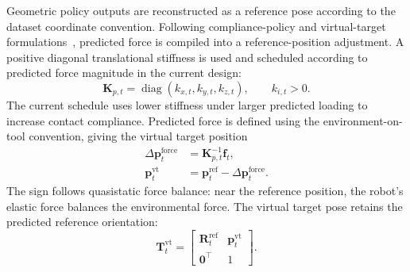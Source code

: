 Geometric policy outputs are reconstructed as a reference pose according to the dataset coordinate convention.
Following compliance-policy and virtual-target formulations~\cite{acp,umift}, predicted force is compiled into a reference-position adjustment.
A positive diagonal translational stiffness is used and scheduled according to predicted force magnitude in the current design:
\begin{equation}
    \mathbf{K}_{p,t}
    =\operatorname{diag}(k_{x,t},k_{y,t},k_{z,t}),
    \qquad k_{i,t}>0.
    \label{eq:translational_stiffness}
\end{equation}
The current schedule uses lower stiffness under larger predicted loading to increase contact compliance.
Predicted force is defined using the environment-on-tool convention, giving the virtual target position
\begin{equation}
\begin{aligned}
    \Delta\mathbf{p}_t^{\mathrm{force}}
        &=\mathbf{K}_{p,t}^{-1}\mathbf{f}_t,\\
    \mathbf{p}_t^{\mathrm{vt}}
        &=\mathbf{p}_t^{\mathrm{ref}}
          -\Delta\mathbf{p}_t^{\mathrm{force}}.
    \label{eq:virtual_position}
\end{aligned}
\end{equation}
The sign follows quasistatic force balance: near the reference position, the robot's elastic force balances the environmental force.
The virtual target pose retains the predicted reference orientation:
\begin{equation}
    \mathbf{T}_t^{\mathrm{vt}}
    =\begin{bmatrix}
        \mathbf{R}_t^{\mathrm{ref}} & \mathbf{p}_t^{\mathrm{vt}}\\
        \mathbf{0}^{\top} & 1
    \end{bmatrix}.
    \label{eq:virtual_pose}
\end{equation}

